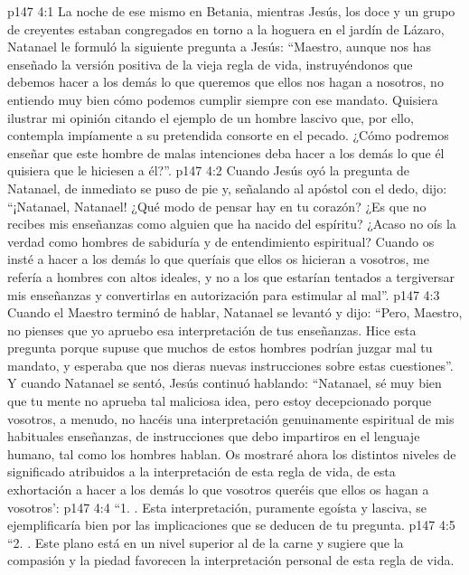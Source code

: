 \vs p147 4:1 La noche de ese mismo  en Betania, mientras Jesús, los doce y un grupo de creyentes estaban congregados en torno a la hoguera en el jardín de Lázaro, Natanael le formuló la siguiente pregunta a Jesús: “Maestro, aunque nos has enseñado la versión positiva de la vieja regla de vida, instruyéndonos que debemos hacer a los demás lo que queremos que ellos nos hagan a nosotros, no entiendo muy bien cómo podemos cumplir siempre con ese mandato. Quisiera ilustrar mi opinión citando el ejemplo de un hombre lascivo que, por ello, contempla impíamente a su pretendida consorte en el pecado. ¿Cómo podremos enseñar que este hombre de malas intenciones deba hacer a los demás lo que él quisiera que le hiciesen a él?”.
\vs p147 4:2 Cuando Jesús oyó la pregunta de Natanael, de inmediato se puso de pie y, señalando al apóstol con el dedo, dijo: “¡Natanael, Natanael! ¿Qué modo de pensar hay en tu corazón? ¿Es que no recibes mis enseñanzas como alguien que ha nacido del espíritu? ¿Acaso no oís la verdad como hombres de sabiduría y de entendimiento espiritual? Cuando os insté a hacer a los demás lo que queríais que ellos os hicieran a vosotros, me refería a hombres con altos ideales, y no a los que estarían tentados a tergiversar mis enseñanzas y convertirlas en autorización para estimular al mal”.
\vs p147 4:3 Cuando el Maestro terminó de hablar, Natanael se levantó y dijo: “Pero, Maestro, no pienses que yo apruebo esa interpretación de tus enseñanzas. Hice esta pregunta porque supuse que muchos de estos hombres podrían juzgar mal tu mandato, y esperaba que nos dieras nuevas instrucciones sobre estas cuestiones”. Y cuando Natanael se sentó, Jesús continuó hablando: “Natanael, sé muy bien que tu mente no aprueba tal maliciosa idea, pero estoy decepcionado porque vosotros, a menudo, no hacéis una interpretación genuinamente espiritual de mis habituales enseñanzas, de instrucciones que debo impartiros en el lenguaje humano, tal como los hombres hablan. Os mostraré ahora los distintos niveles de significado atribuidos a la interpretación de esta regla de vida, de esta exhortación a hacer a los demás lo que vosotros queréis que ellos os hagan a vosotros’:
\vs p147 4:4 “1. . Esta interpretación, puramente egoísta y lasciva, se ejemplificaría bien por las implicaciones que se deducen de tu pregunta.
\vs p147 4:5 \pc “2. . Este plano está en un nivel superior al de la carne y sugiere que la compasión y la piedad favorecen la interpretación personal de esta regla de vida.
